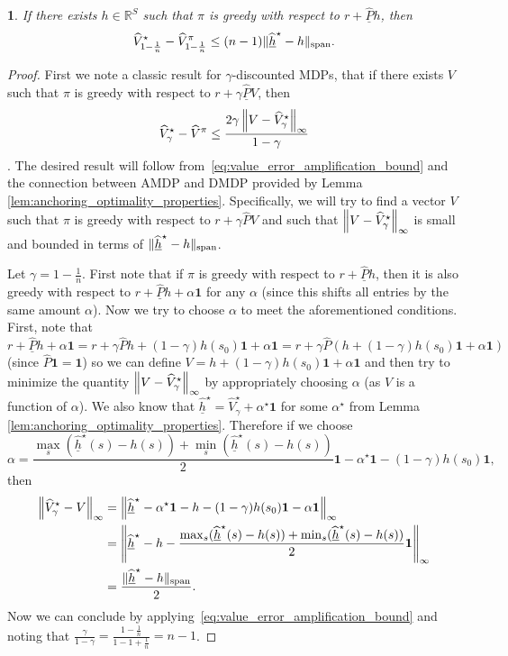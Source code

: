 \documentclass{article}
\theoremstyle{plain}
\theoremstyle{plain}
\newtheorem{lem}[thm]{\protect\lemmaname}
\theoremstyle{remark}
\theoremstyle{plain}
\theoremstyle{plain}
\providecommand{\lemmaname}{Lemma}
\newcommand{\R}{\mathbb{R}}
\newcommand{\Phat}{\widehat{P}}
\newcommand{\Vhat}{\widehat{V}}
\newcommand{\one}{\mathbf{1}}
\newcommand{\hhat}{\widehat{h}}
\newcommand{\Phatanc}{\underline{\Phat}}
\newcommand{\hhatanc}{\underline{\hhat}}
\begin{document}
\begin{lem}
\label{lem:greedy_error_amplification_amdp}
    If there exists $h\in \R^S $ such that $\pi$ is greedy with respect to $r + \Phatanc h$, then
    \[
        \Vhat_{1-\frac{1}{n}}^\star - \Vhat_{1-\frac{1}{n}}^\pi \leq (n-1)\spannorm{\hhatanc^\star - h}.
    \]
\end{lem}
\begin{proof}
    First we note a classic result for $\gamma$-discounted MDPs, that if there exists $V$ such that $\pi$ is greedy with respect to $r + \gamma \Phatanc V$, then
    \begin{align}
        \Vhat_\gamma^\star - \Vhat^{\pi} \leq \frac{2 \gamma \infnorm{V - \Vhat_\gamma^\star}}{1-\gamma} \label{eq:value_error_amplification_bound}
    \end{align}
    \citep{singh_upper_1994}. The desired result will follow from~\eqref{eq:value_error_amplification_bound} and the connection between AMDP and DMDP provided by Lemma \ref{lem:anchoring_optimality_properties}. Specifically, we will try to find a vector $V$ such that $\pi$ is greedy with respect to $r + \gamma \Phat V$ and such that $\infnorm{V - \Vhat^\star_\gamma}$ is small and bounded in terms of $\spannorm{\hhatanc^\star - h}$. 
    
    
    Let $\gamma = 1 - \frac{1}{n}$. First note that if $\pi$ is greedy with respect to $r + \Phatanc h$, then it is also greedy with respect to $r + \Phatanc h + \alpha \one$ for any $\alpha$ (since this shifts all entries by the same amount $\alpha$). Now we try to choose $\alpha$ to meet the aforementioned conditions. First, note that
    \[
    r + \Phatanc h + \alpha \one = r + \gamma \Phat h + (1-\gamma) h(s_0) \one + \alpha \one = r + \gamma \Phat \left(h + (1-\gamma ) h(s_0) \one + \alpha \one \right)
    \]
    (since $\Phat \one = \one$) so we can define $V = h + (1-\gamma ) h(s_0) \one + \alpha \one$ and then try to minimize the quantity $\infnorm{V - \Vhat_\gamma^\star}$ by appropriately choosing $\alpha$ (as $V$ is a function of $\alpha$). We also know that $\hhatanc^\star = \Vhat^\star_\gamma + \alpha^\star \one$ for some $\alpha^\star$ from Lemma \ref{lem:anchoring_optimality_properties}. 
    Therefore if we choose 
    \[
        \alpha = \frac{\max_s (\hhatanc^\star(s) - h(s)) + \min_s (\hhatanc^\star(s) - h(s))}{2}\one - \alpha^\star \one - (1-\gamma) h(s_0) \one, 
    \] 
    then
    \begin{align*}
        \infnorm{\Vhat^\star_\gamma - V} &= \infnorm{\hhatanc^\star - \alpha^\star \one - h - (1-\gamma)h(s_0)\one - \alpha \one}  \\
        &= \infnorm{\hhatanc^\star - h -  \frac{\max_s (\hhatanc^\star(s) - h(s)) + \min_s (\hhatanc^\star(s) - h(s))}{2}\one }   \\
        &= \frac{\spannorm{\hhatanc^\star - h}}{2}.
    \end{align*}
    Now we can conclude by applying~\eqref{eq:value_error_amplification_bound} and noting that $\frac{\gamma}{1-\gamma} = \frac{1-\frac{1}{n}}{1 - 1 + \frac{1}{n}} = n-1$.
\end{proof}
\end{document}
